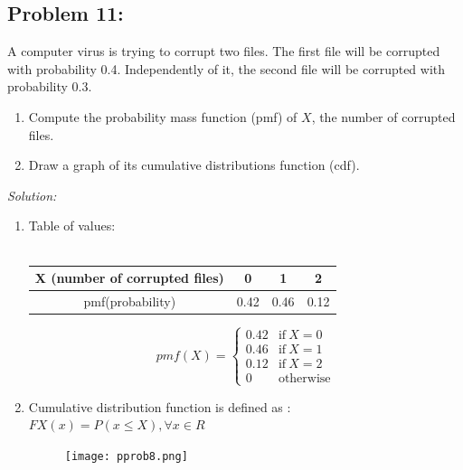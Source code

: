 \documentclass[a4paper]{article}
\begin{document}
\subsection*{Problem 11:}
A computer virus is trying to corrupt two files. The first file will be corrupted with probability 0.4. Independently of it, the second file will be corrupted with probability 0.3.
\begin{enumerate}
	\item Compute the probability mass function (pmf) of $X$, the number of corrupted files.
	\item Draw a graph of its cumulative distributions function (cdf).
\end{enumerate}
\textit{Solution:} \\
\begin{enumerate}
	\item Table of values: \\ \\
	      \begin{tabular}{|c|c|c|c|}
		      \hline 
		      X (number of corrupted files) & 0    & 1    & 2    \\
		      \hline
		      pmf(probability)              & 0.42 & 0.46 & 0.12 \\ 
		      \hline
	      \end{tabular}
	      \begin{equation*}
		      pmf(X) = 
		      \begin{cases}
			      0.42 & \text{if}\ X = 0  \\
			      0.46 & \text{if} \ X = 1 \\
			      0.12 & \text{if} \ X = 2 \\
			      0    & \text{otherwise}
		      \end{cases}
	      \end{equation*}
	\item Cumulative distribution function is defined as : \\
	      $FX(x) = P(x \leq X), \forall x \in R$
	      \begin{figure}[H]
		      \centering
		      \texttt{[image: pprob8.png]}
	      \end{figure}
\end{enumerate}
\end{document}
